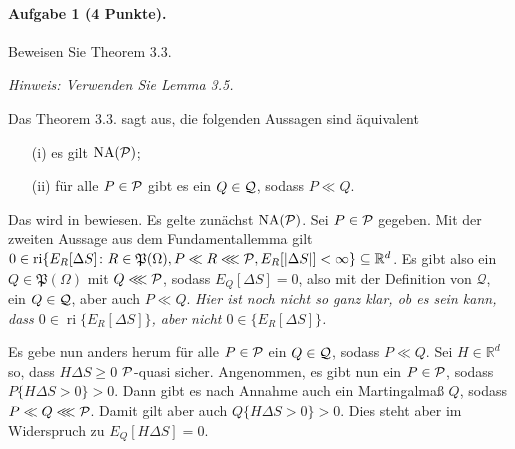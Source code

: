 \documentclass{article}
\begin{document}
\paragraph{Aufgabe 1 \textnormal{(4 Punkte)}.}
Beweisen Sie Theorem 3.3.

\emph{Hinweis: Verwenden Sie Lemma 3.5.}

Das Theorem 3.3. sagt aus, die folgenden Aussagen sind äquivalent
\begin{enumerate}
\item [(i)] es gilt $\mathrm{NA}({\cal P})$;
\item [(ii)] für alle $P\in{\cal P}$ gibt es ein $Q\in{\cal Q}$, sodass $P\ll Q$.
\end{enumerate}
Das wird in \cite[Seite 15]{Bouchard_2015} bewiesen.
Es gelte zunächst $\operatorname{NA}({\cal P})$.
Sei $P\in{\cal P}$ gegeben. Mit der zweiten Aussage aus dem Fundamentallemma gilt $0\in\operatorname{ri}\{E_R[\Delta S]\colon R\in\mathfrak{P}(\Omega), P\ll R\lll {\cal P}, E_R[|\Delta S|]<\infty\}\subseteq \mathbb{R}^d$.
Es gibt also ein $Q\in\mathfrak{P}(\Omega)$ mit  $Q\lll {\cal P}$, sodass $E_Q[\Delta S]=0$, also mit der Definition von $\mathcal{Q}$, ein $Q\in{\cal Q}$, aber auch $P\ll Q$.
\emph{Hier ist noch nicht so ganz klar, ob es sein kann, dass $0\in\operatorname{ri}\{E_R[\Delta S]\}$, aber nicht $0\in\{E_R[\Delta S]\}$.}

Es gebe nun anders herum für alle $P\in {\cal P}$ ein $Q\in{\cal Q}$, sodass $P\ll Q$.
Sei $H\in\mathbb{R}^d$ so, dass $H\Delta S\geq 0$ ${\cal P}$-quasi sicher.
Angenommen, es gibt nun ein $P\in{\cal P}$, sodass $P\{H\Delta S>0\}>0$.
Dann gibt es nach Annahme auch ein Martingalmaß $Q$, sodass $P\ll Q\lll {\cal P}$.
Damit gilt aber auch $Q\{H\Delta S>0\}>0$.
Dies steht aber im Widerspruch zu $E_Q[H\Delta S]=0$.

\end{document}
